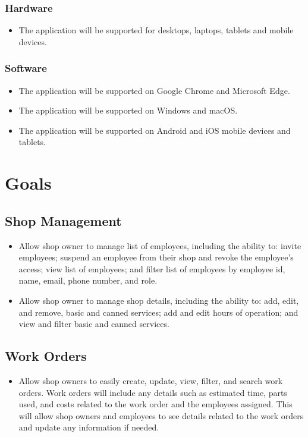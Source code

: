 \documentclass{article}
\begin{document}
\subsubsection{Hardware}
\begin{itemize}
	\item The application will be supported for desktops, laptops, tablets and mobile devices.
\end{itemize}
\subsubsection{Software}
\begin{itemize}
	\item The application will be supported on Google Chrome and Microsoft Edge.
	\item The application will be supported on Windows and macOS.
	\item The application will be supported on Android and iOS mobile devices and tablets.
\end{itemize}

\section{Goals}
\subsection{Shop Management}
\begin{itemize}
	\item Allow shop owner to manage list of employees, including the ability to: invite employees; suspend
	      an employee from their shop and revoke the employee's access; view list of employees; and filter
	      list of employees by employee id, name, email, phone number, and role.
	\item Allow shop owner to manage shop details, including the ability to: add, edit, and remove, basic and
	      canned services; add and edit hours of operation; and view and filter basic and canned services.
\end{itemize}

\subsection{Work Orders}
\begin{itemize}
	\item Allow shop owners to easily create, update, view, filter, and search work orders. Work orders will
	      include any details such as estimated time, parts used, and costs related to the work order and the
	      employees assigned. This will allow shop owners and employees to see details related to the work
	      orders and update any information if needed.
\end{itemize}
\end{document}
